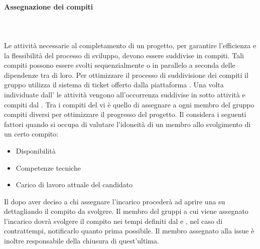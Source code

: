 \paragraph{Assegnazione dei compiti}\mbox{}\\
\mbox{}\\
Le attività necessarie al completamento di un progetto, per garantire l'efficienza e la flessibilità del processo di sviluppo, devono essere suddivise in compiti. Tali compiti possono essere svolti sequenzialmente o in parallelo a seconda delle dipendenze tra di loro. Per ottimizzare il processo di suddivisione dei compiti il gruppo utilizza il sistema di ticket offerto dalla piattaforma .
Una volta individuate dall' \ana{} le attività vengono all'occorrenza suddivise in sotto attività e compiti dal \RdP{}. Tra i compiti del \RdP{} vi è quello di assegnare a ogni membro del gruppo compiti diversi per ottimizzare il progresso del progetto. Il \RdP{} considera i seguenti fattori quando si occupa di valutare l'idoneità di un membro allo svolgimento di un certo compito:
\begin{itemize}
\item Disponibilità
\item Competenze tecniche
\item Carico di lavoro attuale del candidato
\end{itemize}
Il \RdP{} dopo aver deciso a chi assegnare l'incarico procederà ad aprire una  su  dettagliando il compito da svolgere.
Il membro del gruppi a cui viene assegnato l'incarico dovrà svolgere il compito nei tempi definiti dal \RdP{} e , nel caso di contrattempi, notificarlo quanto prima possibile. Il membro assegnato alla issue è inoltre responsabile della chiusura di quest'ultima.